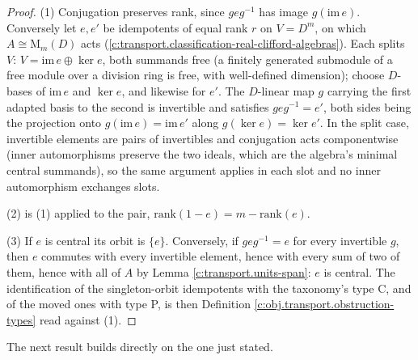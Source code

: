 \documentclass[11pt]{article}
\theoremstyle{definition}
\theoremstyle{plain}
\providecommand{\Mat}{}\renewcommand{\Mat}{\mathrm{M}}
\begin{document}
\begin{proof}
(1) Conjugation preserves rank, since $geg^{-1}$ has image $g(\mathrm{im}\, e)$. Conversely let $e, e'$ be idempotents of equal rank $r$ on $V = D^m$, on which $A \cong \Mat_m(D)$ acts (\ref{c:transport.classification-real-clifford-algebras}). Each splits $V$: $V = \mathrm{im}\,e \oplus \ker e$, both summands free (a finitely generated submodule of a free module over a division ring is free, with well-defined dimension); choose $D$-bases of $\mathrm{im}\,e$ and $\ker e$, and likewise for $e'$. The $D$-linear map $g$ carrying the first adapted basis to the second is invertible and satisfies $g e g^{-1} = e'$, both sides being the projection onto $g(\mathrm{im}\,e) = \mathrm{im}\,e'$ along $g(\ker e) = \ker e'$. In the split case, invertible elements are pairs of invertibles and conjugation acts componentwise (inner automorphisms preserve the two ideals, which are the algebra's minimal central summands), so the same argument applies in each slot and no inner automorphism exchanges slots.

(2) is (1) applied to the pair, $\mathrm{rank}(1-e) = m - \mathrm{rank}(e)$.

(3) If $e$ is central its orbit is $\{e\}$. Conversely, if $geg^{-1} = e$ for every invertible $g$, then $e$ commutes with every invertible element, hence with every sum of two of them, hence with all of $A$ by Lemma \ref{c:transport.units-span}: $e$ is central. The identification of the singleton-orbit idempotents with the taxonomy's type C, and of the moved ones with type P, is then Definition \ref{c:obj.transport.obstruction-types} read against (1).

\end{proof}

The next result builds directly on the one just stated.
\end{document}

